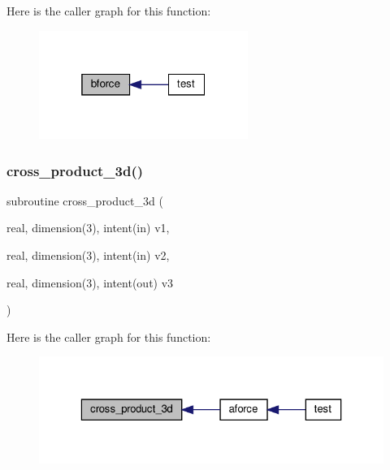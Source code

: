 Here is the caller graph for this function\+:
\nopagebreak
\begin{figure}[H]
\begin{center}
\leavevmode
\includegraphics[width=193pt]{water__optimize_8f90_a1c61ecd9ef781071e23a3290f6371c4d_icgraph}
\end{center}
\end{figure}
\mbox{\label{water__optimize_8f90_a04c9baacf7d82c67687c579db9ec3446}} 
\subsubsection{\texorpdfstring{cross\+\_\+product\+\_\+3d()}{cross\_product\_3d()}}
{\footnotesize\ttfamily subroutine cross\+\_\+product\+\_\+3d (\begin{DoxyParamCaption}\item[{real, dimension(3), intent(in)}]{v1,  }\item[{real, dimension(3), intent(in)}]{v2,  }\item[{real, dimension(3), intent(out)}]{v3 }\end{DoxyParamCaption})}

Here is the caller graph for this function\+:
\nopagebreak
\begin{figure}[H]
\begin{center}
\leavevmode
\includegraphics[width=323pt]{water__optimize_8f90_a04c9baacf7d82c67687c579db9ec3446_icgraph}
\end{center}
\end{figure}
\mbox{\label{water__optimize_8f90_ac09d0de3f934f24e9272c2f52a8eb350}} 
